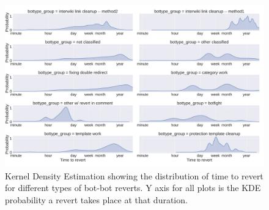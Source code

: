 \documentclass[format=acmsmall, review=false, screen=true]{acmart}%
\begin{document}
\begin{figure}[H]
\includegraphics[width=\textwidth]{figures/ttr-categorized.pdf}
\caption{Kernel Density Estimation showing the distribution of time to revert for different types of bot-bot reverts. Y axis for all plots is the KDE probability a revert takes place at that duration.}
\label{fig:ttr-type}
\end{figure}
\end{document}
